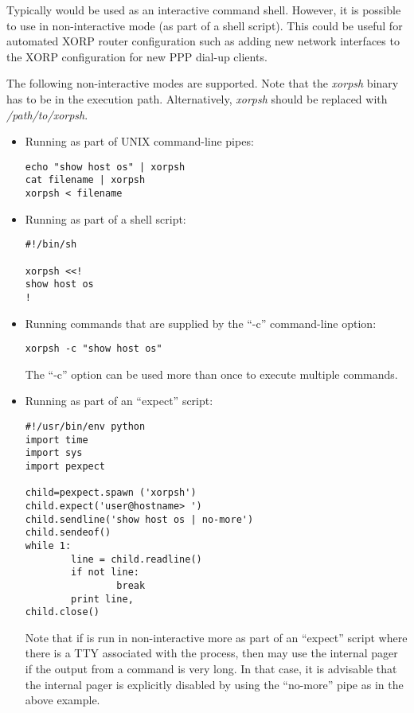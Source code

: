 Typically \xorpsh would be used as an interactive command shell.
However, it is possible to use \xorpsh in non-interactive mode
(\eg as part of a shell script). This could be useful for automated
XORP router configuration such as adding new network interfaces
to the XORP configuration for new PPP dial-up clients.

The following non-interactive modes are supported.
Note that the {\it xorpsh} binary has to be in the execution path.
Alternatively, {\it xorpsh} should be replaced with
{\it /path/to/xorpsh}.

\begin{itemize}

  \item Running \xorpsh as part of UNIX command-line pipes:

\begin{verbatim}
echo "show host os" | xorpsh
cat filename | xorpsh
xorpsh < filename
\end{verbatim}

  \item Running \xorpsh as part of a shell script:

\begin{verbatim}
#!/bin/sh

xorpsh <<!
show host os
!
\end{verbatim}

  \item Running commands that are supplied by the ``-c'' \xorpsh
   command-line option:

\begin{verbatim}
xorpsh -c "show host os"
\end{verbatim}

  The ``-c'' option can be used more than once to execute multiple commands.

  \item Running \xorpsh as part of an ``expect'' script:

\begin{verbatim}
#!/usr/bin/env python
import time
import sys
import pexpect

child=pexpect.spawn ('xorpsh')
child.expect('user@hostname> ')
child.sendline('show host os | no-more')
child.sendeof()
while 1:
        line = child.readline()
        if not line:
                break
        print line,
child.close()
\end{verbatim}

Note that if \xorpsh is run in non-interactive more as part of an ``expect''
script where there is a TTY associated with the \xorpsh process, then
\xorpsh may use the internal pager if the output from a command is very long.
In that case, it is advisable that the internal pager is explicitly disabled
by using the ``no-more'' pipe as in the above example.

\end{itemize}

